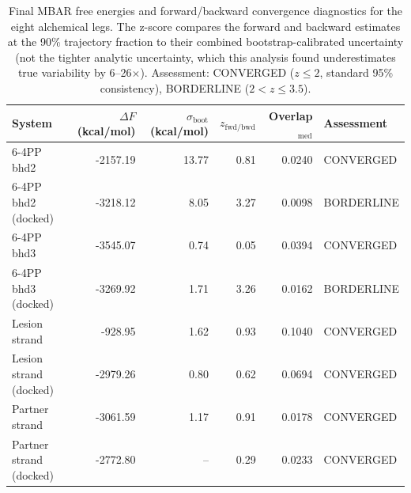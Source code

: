 \begin{table}[h]
\centering
\caption{Final MBAR free energies and forward/backward convergence diagnostics for the eight alchemical legs. The z-score compares the forward and backward estimates at the 90\% trajectory fraction to their combined bootstrap-calibrated uncertainty (not the tighter analytic uncertainty, which this analysis found underestimates true variability by 6--26$\times$). Assessment: CONVERGED ($z\leq2$, standard 95\% consistency), BORDERLINE ($2<z\leq3.5$).}
\label{tab:mbar_convergence}
\begin{tabular}{lrrrrl}
\hline
System & $\Delta F$ (kcal/mol) & $\sigma_{\mathrm{boot}}$ (kcal/mol) & $z_{\mathrm{fwd/bwd}}$ & Overlap$_{\mathrm{med}}$ & Assessment \\
\hline
6-4PP bhd2 & -2157.19 & 13.77 & 0.81 & 0.0240 & CONVERGED \\
6-4PP bhd2 (docked) & -3218.12 & 8.05 & 3.27 & 0.0098 & BORDERLINE \\
6-4PP bhd3 & -3545.07 & 0.74 & 0.05 & 0.0394 & CONVERGED \\
6-4PP bhd3 (docked) & -3269.92 & 1.71 & 3.26 & 0.0162 & BORDERLINE \\
Lesion strand & -928.95 & 1.62 & 0.93 & 0.1040 & CONVERGED \\
Lesion strand (docked) & -2979.26 & 0.80 & 0.62 & 0.0694 & CONVERGED \\
Partner strand & -3061.59 & 1.17 & 0.91 & 0.0178 & CONVERGED \\
Partner strand (docked) & -2772.80 & -- & 0.29 & 0.0233 & CONVERGED \\
\hline
\end{tabular}
\end{table}
